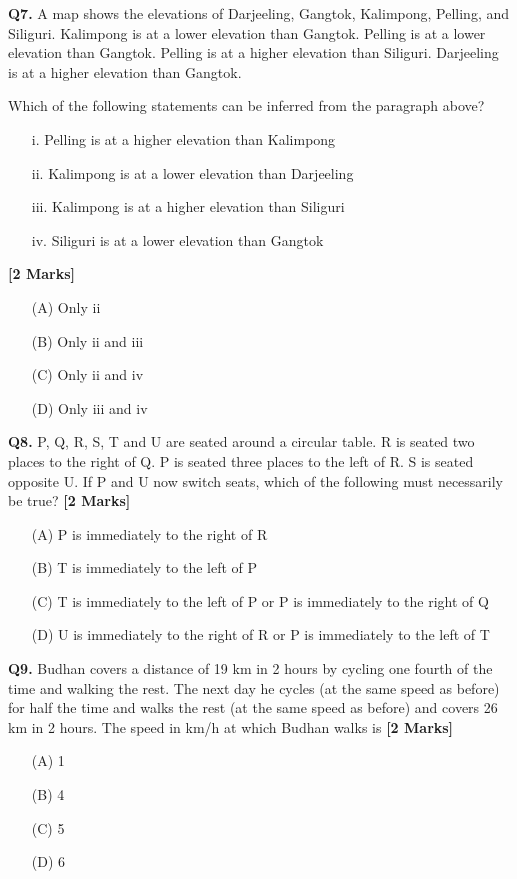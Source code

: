 \documentclass[11pt]{article}
\newcommand{\questionb}[2]{
    \noindent\textbf{Q#2.} #1 \hfill \textbf{[2 Marks]}
}
\begin{document}
\vspace{0.5cm}

\questionb{A map shows the elevations of Darjeeling, Gangtok, Kalimpong, Pelling, and Siliguri.
Kalimpong is at a lower elevation than Gangtok. Pelling is at a lower elevation than Gangtok.
Pelling is at a higher elevation than Siliguri. Darjeeling is at a higher elevation than Gangtok.

Which of the following statements can be inferred from the paragraph above?
\begin{enumerate}
\item [i.] Pelling is at a higher elevation than Kalimpong
\item [ii.] Kalimpong is at a lower elevation than Darjeeling
\item [iii.] Kalimpong is at a higher elevation than Siliguri
\item [iv.] Siliguri is at a lower elevation than Gangtok
\end{enumerate}}{7}
\begin{enumerate}
    \item[(A)] Only ii
    \item[(B)] Only ii and iii
    \item[(C)] Only ii and iv
    \item[(D)] Only iii and iv
\end{enumerate}

\vspace{0.5cm}

\questionb{P, Q, R, S, T and U are seated around a circular table. R is seated two places to the right of Q. P is seated three places to the left of R. S is seated opposite U. If P and U now switch seats, which of the following must necessarily be true?}{8}
\begin{enumerate}
    \item[(A)] P is immediately to the right of R
    \item[(B)] T is immediately to the left of P
    \item[(C)] T is immediately to the left of P or P is immediately to the right of Q
    \item[(D)] U is immediately to the right of R or P is immediately to the left of T
\end{enumerate}

\vspace{0.5cm}

\questionb{Budhan covers a distance of 19 km in 2 hours by cycling one fourth of the time and walking the rest. The next day he cycles (at the same speed as before) for half the time and walks the rest (at the same speed as before) and covers 26 km in 2 hours. The speed in km/h at which Budhan walks is}{9}
\begin{enumerate}
    \item[(A)] 1
    \item[(B)] 4
    \item[(C)] 5
    \item[(D)] 6
\end{enumerate}
\end{document}
